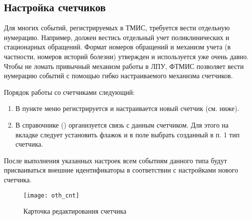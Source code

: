 \subsection{Настройка счетчиков}

Для многих событий, регистрируемых в ТМИС, требуется вести отдельную нумерацию. Например, должен вестись отдельный учет поликлинических и стационарных обращений. Формат номеров обращений и механизм учета (в частности, номеров историй болезни) утвержден и используется уже очень давно. Чтобы не ломать привычный механизм работы в ЛПУ, ФТМИС позволяет вести нумерацию событий с помощью гибко настраиваемого механизма счетчиков.

Порядок работы со счетчиками следующий:
\begin{enumerate}
 \item В пункте меню  регистрируется и настраивается новый счетчик (см. ниже).
 \item В справочнике  () организуется связь с данным счетчиком. Для этого на вкладке  следует установить флажок  и в поле  выбрать созданный в п. 1 тип счетчика.
\end{enumerate}

После выполнения указанных настроек всем событиям данного типа будут присваиваться внешние идентификаторы в соответствии с настройками нового счетчика.

\begin{figure}[ht]\centering
 \texttt{[image: oth\_cnt]}
 \caption{Карточка редактирования счетчика}
 \label{img_oth_cnt}
\end{figure}

